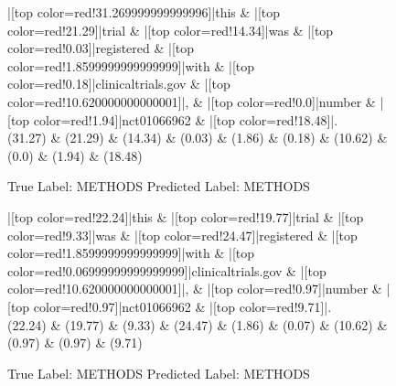 \documentclass[a4paper, landscape]{article}
\begin{document}
\begin{figure}
\begin{center}
\begin{dependency}
\begin{deptext}
|[top color=red!31.269999999999996]|this \& |[top color=red!21.29]|trial \& |[top color=red!14.34]|was \& |[top color=red!0.03]|registered \& |[top color=red!1.8599999999999999]|with \& |[top color=red!0.18]|clinicaltrials.gov \& |[top color=red!10.620000000000001]|, \& |[top color=red!0.0]|number \& |[top color=red!1.94]|nct01066962 \& |[top color=red!18.48]|.\\
(31.27) \& (21.29) \& (14.34) \& (0.03) \& (1.86) \& (0.18) \& (10.62) \& (0.0) \& (1.94) \& (18.48)\\
\end{deptext}
\end{dependency}
\end{center}
\caption{True Label: METHODS Predicted Label: METHODS}
\end{figure}
\clearpage
\begin{figure}
\begin{center}
\begin{dependency}
\begin{deptext}
|[top color=red!22.24]|this \& |[top color=red!19.77]|trial \& |[top color=red!9.33]|was \& |[top color=red!24.47]|registered \& |[top color=red!1.8599999999999999]|with \& |[top color=red!0.06999999999999999]|clinicaltrials.gov \& |[top color=red!10.620000000000001]|, \& |[top color=red!0.97]|number \& |[top color=red!0.97]|nct01066962 \& |[top color=red!9.71]|.\\
(22.24) \& (19.77) \& (9.33) \& (24.47) \& (1.86) \& (0.07) \& (10.62) \& (0.97) \& (0.97) \& (9.71)\\
\end{deptext}
\end{dependency}
\end{center}
\caption{True Label: METHODS Predicted Label: METHODS}
\end{figure}
\end{document}
